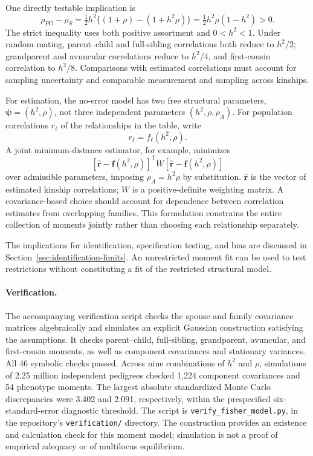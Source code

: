 One directly testable implication is
\begin{equation}
 \rho_{PO}-\rho_S
 =\tfrac12h^2\{(1+\rho)-(1+h^2\rho)\}
 =\boxed{\tfrac12h^2\rho(1-h^2)>0}.
 \label{eq:gap}
\end{equation}
The strict inequality uses both positive assortment and
$0<h^2<1$. Under random mating, parent--child and full-sibling
correlations both reduce to $h^2/2$; grandparent and avuncular
correlations reduce to $h^2/4$, and first-cousin correlation to $h^2/8$.
Comparisons with estimated correlations must account for sampling
uncertainty and comparable measurement and sampling across kinships.

For estimation, the no-error model has two free structural parameters,
$\boldsymbol\psi=(h^2,\rho)$, not three independent parameters
$(h^2,\rho,\rho_A)$. For population correlations $r_\ell$ of the
relationships in the table, write
\[
 r_\ell=f_\ell(h^2,\rho).
\]
A joint minimum-distance estimator, for example, minimizes
\[
 [\widehat{\boldsymbol r}-\boldsymbol f(h^2,\rho)]^{\mathsf T}
 W[\widehat{\boldsymbol r}-\boldsymbol f(h^2,\rho)]
\]
over admissible parameters, imposing $\rho_A=h^2\rho$ by substitution.
$\widehat{\boldsymbol r}$ is the vector of estimated kinship correlations;
$W$ is a positive-definite weighting matrix. A covariance-based choice
should account for dependence between correlation estimates from
overlapping families. This formulation constrains the entire collection
of moments jointly rather than choosing each relationship separately.

The implications for identification, specification testing, and bias
are discussed in Section~\ref{sec:identification-limits}. An unrestricted
moment fit can be used to test restrictions without constituting a fit
of the restricted structural model.

\paragraph{Verification.}
The accompanying verification script checks the spouse and family
covariance matrices algebraically and simulates an explicit Gaussian
construction satisfying the assumptions. It checks parent--child,
full-sibling, grandparent, avuncular, and first-cousin moments, as well
as component covariances and stationary variances. All 46 symbolic checks passed. Across nine combinations of $h^2$ and
$\rho$, simulations of 2.25 million independent pedigrees checked 1,224
component covariances and 54 phenotype moments. The largest absolute
standardized Monte Carlo discrepancies were 3.402 and 2.091, respectively,
within the prespecified six-standard-error diagnostic threshold.
The script is \texttt{verify\_fisher\_model.py}, in the repository's
\texttt{verification/} directory. The construction
provides an existence and calculation check for this moment model;
simulation is not a proof of empirical adequacy or of multilocus
equilibrium.
